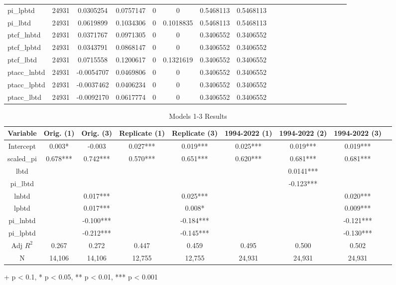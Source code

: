 \documentclass{article}
\begin{document}
\begin{table}[htbp]
\begin{adjustbox}{max width=\textwidth}
\begin{tabular}{|l|c|c|c|c|c|c|c|c|c|c|c|c|c|c|c|c|c|c|}
pi\_lpbtd & 24931 & 0.0305254 & 0.0757147 & 0 & 0 & 0.5468113 & 0.5468113 \\
pi\_lbtd & 24931 & 0.0619899 & 0.1034306 & 0 & 0.1018835 & 0.5468113 & 0.5468113 \\
ptcf\_lnbtd & 24931 & 0.0371767 & 0.0971305 & 0 & 0 & 0.3406552 & 0.3406552 \\
ptcf\_lpbtd & 24931 & 0.0343791 & 0.0868147 & 0 & 0 & 0.3406552 & 0.3406552 \\
ptcf\_lbtd & 24931 & 0.0715558 & 0.1200617 & 0 & 0.1321619 & 0.3406552 & 0.3406552 \\
ptacc\_lnbtd & 24931 & -0.0054707 & 0.0469806 & 0 & 0 & 0.3406552 & 0.3406552 \\
ptacc\_lpbtd & 24931 & -0.0037462 & 0.0406234 & 0 & 0 & 0.3406552 & 0.3406552 \\
ptacc\_lbtd & 24931 & -0.0092170 & 0.0617774 & 0 & 0 & 0.3406552 & 0.3406552 \\
\hline

\end{tabular}
\end{adjustbox}
\end{table}

\begin{table}[htbp]
\centering
\caption{Models 1-3 Results}
\label{tab:Models_1_3_Results}
\begin{adjustbox}{max width=\textwidth}
\begin{tabular}{|c|c|c|c|c|c|c|c|c|}
\hline
Variable & Orig. (1) & Orig. (3) & Replicate (1) & Replicate (3) & 1994-2022 (1) & 1994-2022 (2) & 1994-2022 (3) \\
\hline
Intercept & 0.003* & -0.003 & 0.027*** & 0.019*** & 0.025*** & 0.019*** & 0.019*** \\
scaled\_pi & 0.678*** & 0.742*** & 0.570*** & 0.651*** & 0.620*** & 0.681*** & 0.681*** \\
lbtd &  &  &  &  &  & 0.0141*** & \\
pi\_lbtd &  &  &  &  &  & -0.123*** & \\
lnbtd &  & 0.017*** &  & 0.025*** &  &  & 0.020*** \\
lpbtd &  & 0.017*** &  & 0.008* &  &  & 0.009*** \\
pi\_lnbtd &  & -0.100*** &  & -0.184*** &  &  & -0.121*** \\
pi\_lpbtd &  & -0.212*** &  & -0.145*** &  &  & -0.130*** \\
\hline
Adj $R^2$ & 0.267 & 0.272 & 0.447 & 0.459 & 0.495 & 0.500 & 0.502 \\
\hline
N & 14,106 & 14,106 & 12,755 & 12,755 & 24,931 & 24,931 & 24,931 \\
\hline
\end{tabular}
\end{adjustbox}
\footnotesize{+ p < 0.1, * p < 0.05, ** p < 0.01, *** p < 0.001}
\end{table}
\end{document}
